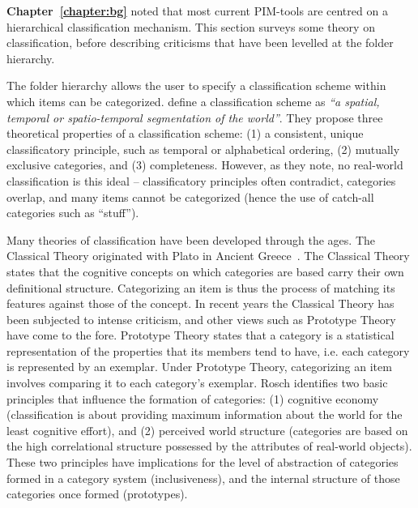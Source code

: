 \textbf{Chapter~\ref{chapter:bg}} noted that most current PIM-tools are centred on a hierarchical classification mechanism.  This section surveys some theory on classification, before describing criticisms that have been levelled at the folder hierarchy.

The folder hierarchy allows the user to specify a classification scheme within which items can be categorized. \citet{bs:99} define a classification scheme as \textit{``a spatial, temporal or spatio-temporal segmentation of the world''}. They propose three theoretical properties of a classification scheme: (1) a consistent, unique classificatory principle, such as temporal or alphabetical ordering, (2) mutually exclusive categories, and (3) completeness. However, as they note, no real-world classification is this ideal -- classificatory principles often contradict, categories overlap, and many items cannot be categorized (hence the use of catch-all categories such as ``stuff'').

Many theories of classification have been developed through the ages. The Classical Theory originated with Plato in Ancient Greece~\citep{ek:90}.  
The Classical Theory states that the cognitive concepts on which categories are based carry their own definitional structure. Categorizing an item is thus the process of matching its features against those of the concept. In recent years the Classical Theory has been subjected to intense criticism, and other views such as Prototype Theory~\citep{er:78} have come to the fore. Prototype Theory states that a category is a statistical representation of the
properties that its members tend to have, i.e. each category is represented by an exemplar. Under Prototype Theory, categorizing an item involves comparing it to each category's exemplar. Rosch identifies two basic principles that influence the formation of categories: (1) cognitive economy (classification is about providing maximum information about the world for the least cognitive effort), and (2) perceived world structure (categories are based on the high correlational structure possessed by the attributes of real-world objects).  These two principles have implications for the level of abstraction of categories formed in a category system (inclusiveness), and the internal structure of those categories once formed (prototypes).

